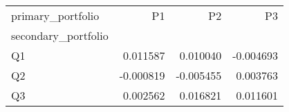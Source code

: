 \begin{tabular}{lrrr}
\toprule
primary_portfolio & P1 & P2 & P3 \\
secondary_portfolio &  &  &  \\
\midrule
Q1 & 0.011587 & 0.010040 & -0.004693 \\
Q2 & -0.000819 & -0.005455 & 0.003763 \\
Q3 & 0.002562 & 0.016821 & 0.011601 \\
\bottomrule
\end{tabular}
